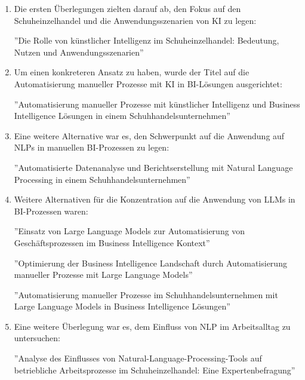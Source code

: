 \begin{enumerate}
    \item Die ersten Überlegungen zielten darauf ab, den Fokus auf den Schuheinzelhandel und die Anwendungsszenarien von KI zu legen:
    
    ''Die Rolle von künstlicher Intelligenz im Schuheinzelhandel: Bedeutung, Nutzen und Anwendungsszenarien''

    \item Um einen konkreteren Ansatz zu haben, wurde der Titel auf die Automatisierung manueller Prozesse mit KI in BI-Lösungen ausgerichtet:
    
    ''Automatisierung manueller Prozesse mit künstlicher Intelligenz und Business Intelligence Lösungen in einem Schuhhandelsunternehmen''

    \item Eine weitere Alternative war es, den Schwerpunkt auf die Anwendung auf NLPs in manuellen BI-Prozessen zu legen:
    
    ''Automatisierte Datenanalyse und Berichtserstellung mit Natural Language Processing in einem Schuhhandelsunternehmen''

    \item Weitere Alternativen für die Konzentration auf die Anwendung von LLMs in BI-Prozessen waren:
    
    ''Einsatz von Large Language Models zur Automatisierung von Geschäftsprozessen im Business Intelligence Kontext''

    ''Optimierung der Business Intelligence Landschaft durch Automatisierung manueller Prozesse mit Large Language Models''

    ''Automatisierung manueller Prozesse im Schuhhandelsunternehmen mit Large Language Models in Business Intelligence Lösungen''

    \item  Eine weitere Überlegung war es, dem Einfluss von NLP im Arbeitsalltag zu untersuchen:

    ''Analyse des Einflusses von Natural-Language-Processing-Tools auf betriebliche Arbeitsprozesse im Schuheinzelhandel: Eine Expertenbefragung''
    
\end{enumerate}

\clearpage